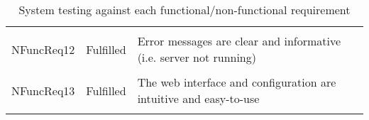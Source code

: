 \begin{longtable}{ l l p{5cm} }
    \\ \\
    NFuncReq12          & Fulfilled                 & Error messages are clear
                                                      and informative (i.e.
                                                      server not running)
    \\ \\
    NFuncReq13          & Fulfilled                 & The web interface and
                                                      configuration are
                                                      intuitive and easy-to-use
    \\ \bottomrule
\caption{System testing against each functional/non-functional requirement}
\label{tab:system-testing}
\end{longtable}
